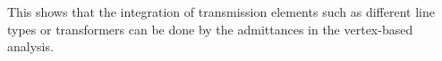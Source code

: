% 
This shows that the integration of transmission elements such as different line
types or transformers can be done by the admittances in the vertex-based
analysis. 
% 
% 
